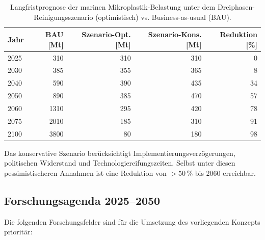 ﻿\documentclass[12pt,a4paper]{article}
\theoremstyle{definition}
\theoremstyle{remark}
\begin{document}
\begin{table}[H]
\centering
\caption{Langfristprognose der marinen Mikroplastik-Belastung unter dem
  Dreiphasen-Reinigungsszenario (optimistisch) vs. Business-as-usual (BAU).}
\label{tab:prognose}
\begin{tabular}{lrrrr}
\toprule
\textbf{Jahr} & \textbf{BAU [Mt]} & \textbf{Szenario-Opt. [Mt]} & \textbf{Szenario-Kons. [Mt]} & \textbf{Reduktion [\%]} \\
\midrule
2025 & 310 & 310 & 310 & 0 \\
2030 & 385 & 355 & 365 & 8 \\
2040 & 590 & 390 & 435 & 34 \\
2050 & 890 & 385 & 470 & 57 \\
2060 & 1310 & 295 & 420 & 78 \\
2075 & 2010 & 185 & 310 & 91 \\
2100 & 3800 & 80 & 180 & 98 \\
\bottomrule
\end{tabular}
\end{table}

Das konservative Szenario ber\"ucksichtigt Implementierungsverz\"ogerungen,
politischen Widerstand und Technologiereifungszeiten. Selbst unter diesen
pessimistischeren Annahmen ist eine Reduktion von $> 50\,\%$ bis 2060
erreichbar.

\subsection{Forschungsagenda 2025--2050}

Die folgenden Forschungsfelder sind f\"ur die Umsetzung des vorliegenden
Konzepts prioritär:
\end{document}
